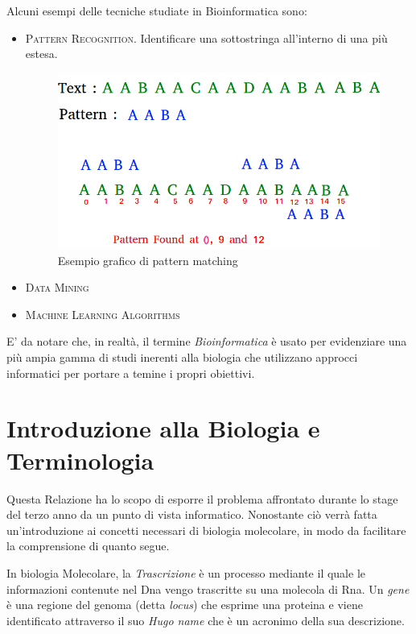 Alcuni esempi delle tecniche studiate in Bioinformatica sono:

\begin{itemize}
    \item \textsc{Pattern Recognition.} Identificare una sottostringa all'interno di una più estesa.
        \begin{figure}[h]
        \centering
        \includegraphics[scale= 0.5]{images/pattern matching.png}
        \caption{Esempio grafico di pattern matching}
        \label{fig:pattern_matching}
        \end{figure}
    \item \textsc{Data Mining}
    \item \textsc{Machine Learning Algorithms}
\end{itemize}

E' da notare che, in realtà, il termine \textit{Bioinformatica} è usato per evidenziare una più ampia gamma di studi inerenti alla biologia che utilizzano approcci informatici per portare a temine i propri obiettivi.

\newpage

\section{Introduzione alla Biologia e Terminologia}
Questa Relazione ha lo scopo di esporre il problema affrontato durante lo stage del terzo anno da un punto di vista informatico. Nonostante ciò verrà fatta un'introduzione ai concetti necessari di biologia molecolare, in modo da facilitare la comprensione di quanto segue.

In biologia Molecolare, la \textit{Trascrizione} è un processo mediante il quale le informazioni contenute nel Dna vengo trascritte su una molecola di Rna.
Un \textit{gene} è una regione del genoma (detta \textit{locus}) che esprime una proteina e viene identificato attraverso il suo \textit{Hugo name} che è un acronimo della sua descrizione.

